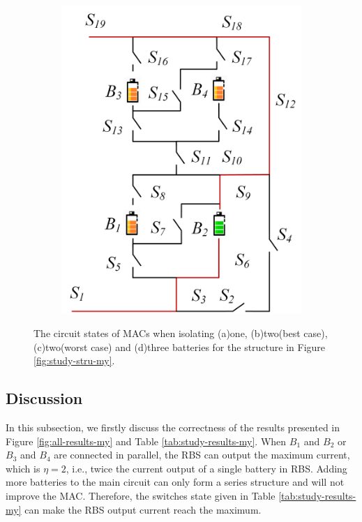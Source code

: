 \documentclass{article}
\begin{document}
\begin{figure}[htbp]
\begin{subfigure}[b]{0.31\textwidth}
          \includegraphics[width=\textwidth]{my-isolated-3}
          \caption{}
          \label{fig:my-isolated-3}
      \end{subfigure}
      \caption{
          The circuit states of MACs when isolating (a)one, (b)two(best case), (c)two(worst case) and (d)three batteries for the structure in Figure \ref{fig:study-stru-my}.
          }
  \end{figure}

\subsection{Discussion}

In this subsection, we firstly discuss the correctness of the results presented in Figure \ref{fig:all-results-my} and Table \ref{tab:study-results-my}. 
When $B_1$ and $B_2$ or $B_3$ and $B_4$ are connected in parallel, the RBS can output the maximum current, which is $\eta=2$, i.e., twice the current output of a single battery in RBS. 
Adding more batteries to the main circuit can only form a series structure and will not improve the MAC. 
Therefore, the switches state given in Table \ref{tab:study-results-my} can make the RBS output current reach the maximum.
\end{document}
